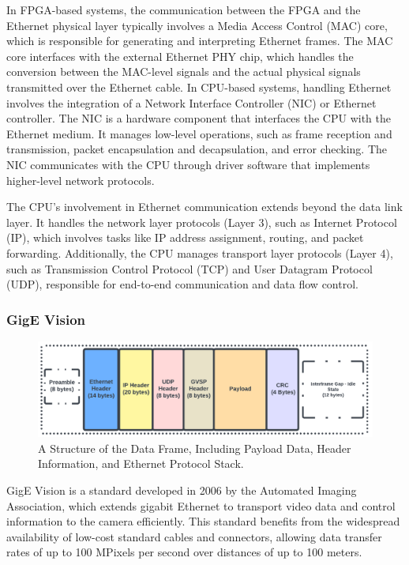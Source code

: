 In FPGA-based systems, the communication between the FPGA and the Ethernet physical layer typically involves a Media Access Control (MAC) core, which is responsible for generating and interpreting Ethernet frames. The MAC core interfaces with the external Ethernet PHY chip, which handles the conversion between the MAC-level signals and the actual physical signals transmitted over the Ethernet cable. In CPU-based systems, handling Ethernet involves the integration of a Network Interface Controller (NIC) or Ethernet controller. The NIC is a hardware component that interfaces the CPU with the Ethernet medium. It manages low-level operations, such as frame reception and transmission, packet encapsulation and decapsulation, and error checking. The NIC communicates with the CPU through driver software that implements higher-level network protocols.

The CPU's involvement in Ethernet communication extends beyond the data link layer. It handles the network layer protocols (Layer 3), such as Internet Protocol (IP), which involves tasks like IP address assignment, routing, and packet forwarding. Additionally, the CPU manages transport layer protocols (Layer 4), such as Transmission Control Protocol (TCP) and User Datagram Protocol (UDP), responsible for end-to-end communication and data flow control. 

\subsubsection{GigE Vision}
\begin{figure}[H]
\centering
\includegraphics[width=\linewidth]{Images/GigEVision.png}
\caption[GigE Vision Stream Packet]{A Structure of the Data Frame, Including Payload Data, Header Information, and Ethernet Protocol Stack.}
\label{fig:GigEVision}
\end{figure} 

GigE Vision is a standard developed in 2006 by the Automated Imaging Association\cite{GigE}, which extends gigabit Ethernet to transport video data and control information to the camera efficiently. This standard benefits from the widespread availability of low-cost standard cables and connectors, allowing data transfer rates of up to 100 MPixels per second over distances of up to 100 meters.


